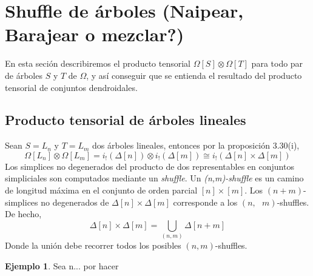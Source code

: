 \documentclass[11pt,a4paper,openright,oneside]{article}
\numberwithin{equation}{section}
\theoremstyle{definition}
\newtheorem{ex}[teo]{Ejemplo}
\begin{document}

\section{Shuffle de \'arboles (Naipear, Barajear o mezclar?)}
En esta seci\'on describiremos el producto tensorial $\Omega[S]\otimes\Omega[T]$ para todo par de \'arboles $S$ y $T$ de $\Omega$, y as\'i conseguir que se entienda el resultado del producto tensorial de conjuntos dendroidales.
\subsection{Producto tensorial de \'arboles lineales}
Sean $S=L_n$ y $T=L_m$ dos \'arboles lineales, entonces por la proposici\'on 3.30(i),
$$
    \Omega[L_n]\otimes\Omega[L_m]=i_!(\Delta[n])\otimes i_!(\Delta[m])\cong i_!(\Delta[n]\times\Delta[m])
$$
Los simplices no degenerados del producto de dos representables en conjuntos simpliciales son computados mediante un \emph{shuffle}. Un \emph{(n,m)-shuffle} es un camino de longitud m\'axima en el conjunto de orden parcial $[n]\times[m]$.
Los $(n+m)$-simplices no degenerados de $\Delta[n]\times\Delta[m]$ corresponde a los $(n,\text{ }m)$-shuffles. De hecho,
$$
    \Delta[n]\times\Delta[m] = \bigcup_{(n,m)}\Delta[n+m]
$$
Donde la uni\'on debe recorrer todos los posibles $(n,m)$-shuffles.
\begin{ex}
    Sea n... por hacer
\end{ex}
\end{document}

